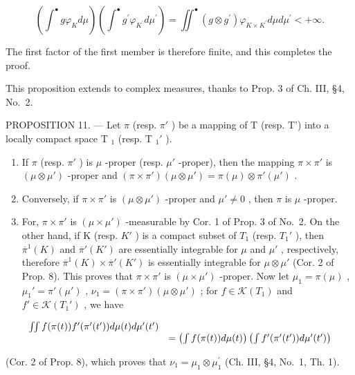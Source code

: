 \[
\left(\int^ {\bullet} g \varphi_ {K} d \mu\right) \left(\int^ {\bullet} g ^ {\prime} \varphi_ {K ^ {\prime}} d \mu^ {\prime}\right) = \iint^ {\bullet} (g \otimes g ^ {\prime}) \varphi_ {K \times K ^ {\prime}} d \mu d \mu^ {\prime} <   + \infty .
\]

The first factor of the first member is therefore finite, and this completes the proof.

This proposition extends to complex measures, thanks to Prop. 3 of Ch. III, §4, No.~2.

PROPOSITION 11. --- Let \(\pi\) (resp. \(\pi'\) ) be a mapping of T (resp. T') into a locally compact space T \(_1\) (resp. T \(_1'\) ).

\begin{enumerate}
\def\labelenumi{\alph{enumi})}
\item
  If \(\pi\) (resp. \(\pi'\) ) is \(\mu\) -proper (resp. \(\mu'\) -proper), then the mapping \(\pi \times \pi'\) is \((\mu \otimes \mu')\) -proper and \((\pi \times \pi')(\mu \otimes \mu') = \pi(\mu) \otimes \pi'(\mu')\) .
\item
  Conversely, if \(\pi \times \pi'\) is \((\mu \otimes \mu')\) -proper and \(\mu' \neq 0\) , then \(\pi\) is \(\mu\) -proper.
\item
  For, \(\pi \times \pi'\) is \((\mu \times \mu')\) -measurable by Cor. 1 of Prop. 3 of No.~2. On the other hand, if K (resp. \(K'\) ) is a compact subset of \(T_1\) (resp. \(T_1'\) ), then \(\overline{\pi}^1(K)\) and \(\overline{\pi}'(K')\) are essentially integrable for \(\mu\) and \(\mu'\) , respectively, therefore \(\overline{\pi}^1(K) \times \overline{\pi}'(K')\) is essentially integrable for \(\mu \otimes \mu'\) (Cor. 2 of Prop. 8). This proves that \(\pi \times \pi'\) is \((\mu \times \mu')\) -proper. Now let \(\mu_1 = \pi(\mu)\) , \(\mu_1' = \pi'(\mu')\) , \(\nu_1 = (\pi \times \pi')(\mu \otimes \mu')\) ; for \(f \in \mathcal{K}(T_1)\) and \(f' \in \mathcal{K}(T_1')\) , we have
\end{enumerate}

\[
\begin{array}{r l} \iint f (\pi (t)) f ^ {\prime} (\pi^ {\prime} (t ^ {\prime})) d \mu (t) d \mu^ {\prime} (t ^ {\prime}) \\ & = \left(\int f (\pi (t)) d \mu (t)\right) \left(\int f ^ {\prime} (\pi^ {\prime} (t ^ {\prime})) d \mu^ {\prime} (t ^ {\prime})\right) \end{array}
\]

(Cor. 2 of Prop. 8), which proves that \(\nu_{1} = \mu_{1}\otimes \mu_{1}^{\prime}\) (Ch. III, §4, No.~1, Th. 1).

